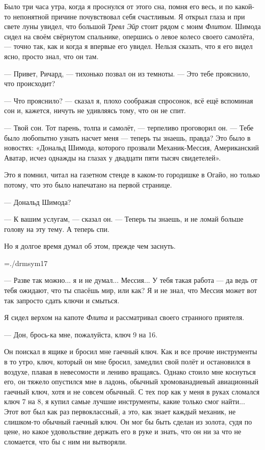 Было три часа утра, когда я проснулся от этого сна, помня его весь, и по какой-то непонятной
причине почувствовал себя счастливым. Я открыл глаза и при свете луны увидел, что большой
{\it Тревл Эйр\/} стоит рядом с моим {\it Флитом}. Шимода сидел на своём свёрнутом спальнике, опершись о левое колесо своего самолёта, --- точно так, как и когда я впервые его увидел. Нельзя сказать, что я его видел ясно, просто знал, что он там.

--- Привет, Ричард, --- тихонько позвал он из темноты. --- Это тебе прояснило, что происходит?

--- Что прояснило? --- сказал я, плохо соображая спросонок, всё ещё вспоминая сон и, кажется, ничуть не удивляясь тому, что он не спит.

--- Твой сон. Тот парень, толпа и самолёт, --- терпеливо проговорил он. --- Тебе было любопытно узнать насчет меня --- теперь ты знаешь, правда? Это было в новостях: «Дональд Шимода, которого прозвали Механик-Мессия, Американский Аватар, исчез однажды на глазах у двадцати пяти тысяч свидетелей».

Это я помнил, читал на газетном стенде в каком-то городишке в Огайо, но только потому, что это было напечатано на первой странице.

--- Дональд Шимода?

--- К вашим услугам, --- сказал он. --- Теперь ты знаешь, и не ломай больше голову на эту тему. А теперь спи.

Но я долгое время думал об этом, прежде чем заснуть.

\vskip15pt
\hbox{\kern5cm\font\sym=./drmsym17 \sym {}}
\vskip20pt

--- Разве так можно... я и не думал... Мессия... У тебя такая работа --- да ведь от тебя ожидают, что ты спасёшь мир, или как? Я и не знал, что Мессия может вот так запросто сдать ключи и смыться.

Я сидел верхом на капоте {\it Флита\/} и рассматривал своего странного приятеля.

--- Дон, брось-ка мне, пожалуйста, ключ 9 на 16.

Он поискал в ящике и бросил мне гаечный ключ. Как и все прочие инструменты в то утро, ключ, который он мне бросил, замедлил свой полёт и остановился в воздухе, плавая в невесомости и лениво вращаясь. Однако стоило мне коснуться его, он тяжело опустился мне в ладонь, обычный хромованадиевый авиационный гаечный ключ, хотя и не совсем обычный. С тех пор как у меня в руках сломался ключ 7 на 8, я купил самые лучшие инструменты, какие только смог найти... Этот вот был как раз первоклассный, а это, как знает каждый механик, не слишком-то обычный гаечный ключ. Он мог бы быть сделан из золота, судя по цене, но какое удовольствие держать его в руке и знать, что он ни за что не сломается, что бы с ним ни вытворяли.

